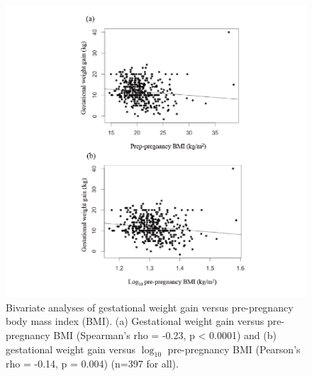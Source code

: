 \begin{figure}
  \centering
    \label{fig:Fig310}
  \includegraphics[scale=1]{Figures/Fig310.pdf}
  \caption[Bivariate analyses of gestational weight gain versus pre-pregnancy body mass index]{Bivariate analyses of gestational weight gain versus pre-pregnancy body mass index (BMI). (a) Gestational weight gain versus pre-pregnancy BMI (Spearman's rho = -0.23, p < 0.0001) and (b) gestational weight gain versus $\log_{10}$ pre-pregnancy BMI (Pearson's rho = -0.14, p = 0.004) (n=397 for all).}
\end{figure}

